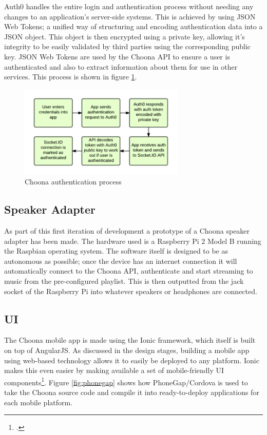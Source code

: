 Auth0 handles the entire login and authentication process without needing any changes to an application's server-side systems. This is achieved by using JSON Web Tokens; a unified way of structuring and encoding authentication data into a JSON object. This object is then encrypted using a private key, allowing it's integrity to be easily validated by third parties using the corresponding public key. JSON Web Tokens are used by the Choona API to ensure a user is authenticated and also to extract information about them for use in other services. This process is shown in figure \ref{fig:auth-process}.

\begin{figure}[h!]
  \centering
  \includegraphics[width=0.7\textwidth]{./img/auth-process.png}
  \caption{Choona authentication process}
  \label{fig:auth-process}
\end{figure}


\subsection{Speaker Adapter}

As part of this first iteration of development a prototype of a Choona speaker adapter has been made. The hardware used is a Raspberry Pi 2 Model B running the Raspbian operating system. The software itself is designed to be as autonomous as possible; once the device has an internet connection it will automatically connect to the Choona API, authenticate and start streaming to music from the pre-configured playlist. This is then outputted from the jack socket of the Raspberry Pi into whatever speakers or headphones are connected.


\subsection{UI}

The Choona mobile app is made using the Ionic framework, which itself is built on top of AngularJS. As discussed in the design stages, building a mobile app using web-based technology allows it to easily be deployed to any platform. Ionic makes this even easier by making available a set of mobile-friendly UI components\footcite{ionic}. Figure \ref{fig:phonegap} shows how PhoneGap/Cordova is used to take the Choona source code and compile it into ready-to-deploy applications for each mobile platform.

